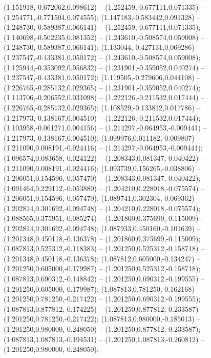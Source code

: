  (1.151918,-0.672062,0.098612) -- (1.252459,-0.677111,0.071335) -- (1.254771,-0.771504,0.074555);
 (1.147183,-0.583442,0.091328) -- (1.248730,-0.589387,0.066141) -- (1.252459,-0.677111,0.071335);
 (1.140698,-0.502235,0.081352) -- (1.243610,-0.508574,0.059008) -- (1.248730,-0.589387,0.066141);
 (1.133044,-0.427131,0.069286) -- (1.237547,-0.433381,0.050172) -- (1.243610,-0.508574,0.059008);
 (1.125944,-0.353092,0.056832) -- (1.231901,-0.359052,0.040274) -- (1.237547,-0.433381,0.050172);
 (1.119505,-0.279606,0.044108) -- (1.226765,-0.285132,0.029365) -- (1.231901,-0.359052,0.040274);
 (1.113706,-0.206552,0.031098) -- (1.222126,-0.211532,0.017444) -- (1.226765,-0.285132,0.029365);
 (1.108529,-0.133812,0.017786) -- (1.217973,-0.138167,0.004510) -- (1.222126,-0.211532,0.017444);
 (1.103958,-0.061271,0.004156) -- (1.214297,-0.064953,-0.009441) -- (1.217973,-0.138167,0.004510);
 (1.099976,0.011182,-0.009807) -- (1.211090,0.008191,-0.024416) -- (1.214297,-0.064953,-0.009441);
 (1.096574,0.083658,-0.024122) -- (1.208343,0.081347,-0.040422) -- (1.211090,0.008191,-0.024416);
 (1.093739,0.156265,-0.038806) -- (1.206051,0.154596,-0.057470) -- (1.208343,0.081347,-0.040422);
 (1.091464,0.229112,-0.053880) -- (1.204210,0.228018,-0.075574) -- (1.206051,0.154596,-0.057470);
 (1.089741,0.302304,-0.069362) -- (1.202814,0.301692,-0.094748) -- (1.204210,0.228018,-0.075574);
 (1.088565,0.375951,-0.085274) -- (1.201860,0.375699,-0.115009) -- (1.202814,0.301692,-0.094748);
 (1.087933,0.450160,-0.101639) -- (1.201348,0.450118,-0.136378) -- (1.201860,0.375699,-0.115009);
 (1.087813,0.525312,-0.118383) -- (1.201250,0.525312,-0.158718) -- (1.201348,0.450118,-0.136378);
 (1.087812,0.605000,-0.134247) -- (1.201250,0.605000,-0.179987) -- (1.201250,0.525312,-0.158718);
 (1.087813,0.690312,-0.148842) -- (1.201250,0.690312,-0.199555) -- (1.201250,0.605000,-0.179987);
 (1.087813,0.781250,-0.162168) -- (1.201250,0.781250,-0.217422) -- (1.201250,0.690312,-0.199555);
 (1.087813,0.877812,-0.174225) -- (1.201250,0.877812,-0.233587) -- (1.201250,0.781250,-0.217422);
 (1.087813,0.980000,-0.185013) -- (1.201250,0.980000,-0.248050) -- (1.201250,0.877812,-0.233587);
 (1.087813,1.087813,-0.194531) -- (1.201250,1.087813,-0.260812) -- (1.201250,0.980000,-0.248050);
